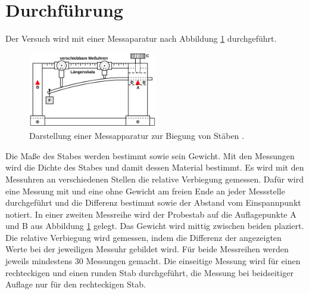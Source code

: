 \section{Durchführung}
\label{sec:Durchführung}
Der Versuch wird mit einer Messaparatur nach Abbildung \ref{fig:Messapparatur}
durchgeführt.
\begin{figure}[H]
  \centering
  \includegraphics[width=0.5\textwidth]{Messapparatur.png}
  \caption{Darstellung einer Messapparatur zur Biegung von Stäben \cite{sample} .}
  \label{fig:Messapparatur}
\end{figure}
Die Maße des Stabes werden bestimmt sowie sein Gewicht. Mit den Messungen wird die
Dichte des Stabes und damit dessen Material bestimmt. Es wird mit den Messuhren
an verschiedenen Stellen die relative Verbiegung gemessen. Dafür wird
eine Messung mit und eine ohne Gewicht am freien Ende an jeder Messstelle
durchgeführt und die Differenz bestimmt sowie der Abstand vom Einspannpunkt notiert.
In einer zweiten Messreihe wird der Probestab auf die Auflagepunkte A und B aus
Abbildung \ref{fig:Messapparatur} gelegt. Das Gewicht wird mittig zwischen beiden
plaziert. Die relative Verbiegung wird gemessen, indem die Differenz der angezeigten
Werte bei der jeweiligen Messuhr gebildet wird. Für beide Messreihen werden
jeweils mindestens 30 Messungen gemacht. Die einseitige Messung wird für einen
 rechteckigen und einen runden Stab durchgeführt, die Messung bei beidseitiger
 Auflage nur für den rechteckigen Stab.
